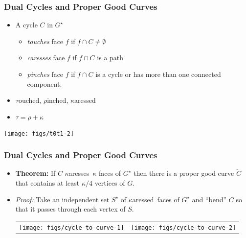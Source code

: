 \documentclass[xcolor=dvipsnames]{beamer}
\newcommand{\caressed}{$\kappa$aressed}
\newcommand{\caresses}{$\kappa$aresses}
\newcommand{\dual}[1]{#1^\star}
\begin{document}
\begin{frame}
   \frametitle{Dual Cycles and Proper Good Curves}

   \begin{itemize}[<+->]
      \item A cycle $C$ in $\dual{G}$
      \begin{itemize}
         \item \emph{touches} face $f$ if $f\cap C\neq\emptyset$
         \item \emph{caresses} face $f$ if $f\cap C$ is a path
         \item \emph{pinches} face $f$ if $f\cap C$ is a cycle or has more
               than one connected component.
      \end{itemize}
      \item $\tau$ouched, $\rho$inched, $\kappa$aressed
      \item $\tau = \rho + \kappa$
   \end{itemize}

   \begin{center}
      \texttt{[image: figs/t0t1-2]}
   \end{center}
\end{frame}

\begin{frame}
  \frametitle{Dual Cycles and Proper Good Curves}

  \begin{itemize}[<+->]
    \item[]\textbf{Theorem:} If $C$ \caresses\ $\kappa$ faces of $\dual{G}$ then there is a proper good curve $\tilde{C}$ that contains at least $\kappa/4$ vertices of $G$.\\[1em]
    
    \item[]\textit{Proof:} Take an independent set $\dual{S}$ of \caressed\ faces of $\dual{G}$ and ``bend'' $C$ so that it passes through each vertex of $S$.
    \begin{center}
      \begin{tabular}{cc}
        \texttt{[image: figs/cycle-to-curve-1]} &
        \texttt{[image: figs/cycle-to-curve-2]}
      \end{tabular}
  \end{center}
  \end{itemize}
  
\end{frame}
\end{document}
